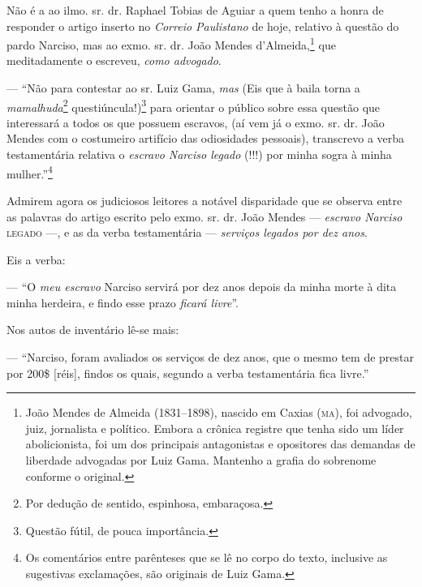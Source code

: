 {Não é a ao ilmo. sr. dr. Raphael Tobias de Aguiar a quem tenho a honra
de responder o artigo inserto no \emph{Correio Paulistano} de hoje,
relativo à questão do pardo Narciso, mas ao exmo. sr. dr. João Mendes
d'Almeida,\footnote{ João Mendes de Almeida (1831--1898), nascido em
  Caxias (\textsc{ma}), foi advogado, juiz, jornalista e político. Embora a
  crônica registre que tenha sido um líder abolicionista, foi um dos
  principais antagonistas e opositores das demandas de liberdade
  advogadas por Luiz Gama. Mantenho a grafia do sobrenome conforme o
  original.} que meditadamente o escreveu, \emph{como advogado}.

--- ``Não para contestar ao sr. Luiz Gama, \emph{mas} (Eis que à baila
torna a \emph{mamalhuda}\footnote{ Por dedução de sentido,
  espinhosa, embaraçosa.} questiúncula!)\footnote{ Questão fútil, de
  pouca importância.} para orientar o público sobre essa questão que
interessará a todos os que possuem escravos, (aí vem já o exmo. sr. dr.
João Mendes com o costumeiro artifício das odiosidades pessoais),
transcrevo a verba testamentária relativa o \emph{escravo Narciso
legado} (!!!) por minha sogra à minha mulher.''\footnote{ Os
  comentários entre parênteses que se lê no corpo do texto, inclusive as
  sugestivas exclamações, são originais de Luiz Gama.}

Admirem agora os judiciosos leitores a notável disparidade que se
observa entre as palavras do artigo escrito pelo exmo. sr. dr. João
Mendes --- \emph{escravo Narciso} \textsc{legado} ---, e as da verba
testamentária --- \emph{serviços legados por dez anos}.

Eis a verba:

--- ``O \emph{meu escravo} Narciso servirá por dez anos depois da minha
morte à dita minha herdeira, e findo esse prazo \emph{ficará livre}''.

Nos autos de inventário lê-se mais:

--- ``Narciso, foram avaliados os serviços de dez anos, que o mesmo tem
de prestar por 200\$ {[}réis{]}, findos os quais, segundo a verba
testamentária fica livre.''

}
